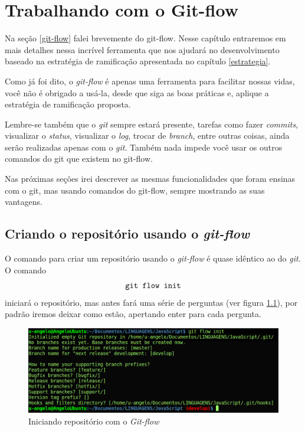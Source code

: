 \documentclass[12pt,openright,oneside,a4paper,english,brazil]{abntex2}
\begin{document}
\chapter{Trabalhando com o Git-flow}

Na seção \ref{git-flow} falei brevemente do git-flow. Nesse capítulo entraremos em mais detalhes nessa incrível ferramenta que nos ajudará no desenvolvimento baseado na estratégia de ramificação apresentada no capítulo \ref{estrategia}. 

Como já foi dito, o \textit{git-flow} é apenas uma ferramenta para facilitar nossas vidas, você não é obrigado a usá-la, desde que siga as boas práticas e, aplique a estratégia de ramificação proposta. 

Lembre-se também que o \textit{git} sempre estará presente, tarefas como fazer \textit{commits}, visualizar o \textit{status}, visualizar o \textit{log}, trocar de \textit{branch}, entre outras coisas, ainda serão realizadas apenas com o \textit{git}. Também nada impede você usar os outros comandos do git que existem no git-flow.

Nas próximas seções irei descrever as mesmas funcionalidades que foram ensinas com o git, mas usando comandos do git-flow, sempre mostrando as suas vantagens.

\section{Criando o repositório usando o \textit{git-flow}}

O comando para criar um repositório usando o \textit{git-flow} é quase idêntico ao do \textit{git}. O comando $$\verb|git flow init|$$ iniciará o repositório, mas antes fará uma série de perguntas (ver figura \ref{initGitFlow}), por padrão iremos deixar como estão, apertando enter para cada pergunta.

\begin{figure}[htb]
	\caption{\label{initGitFlow}Iniciando repositório com o \textit{Git-flow}}
	\begin{center}
		\includegraphics[width=1\linewidth]{imagens/initGitFlow}
	\end{center}
\end{figure}
\end{document}
